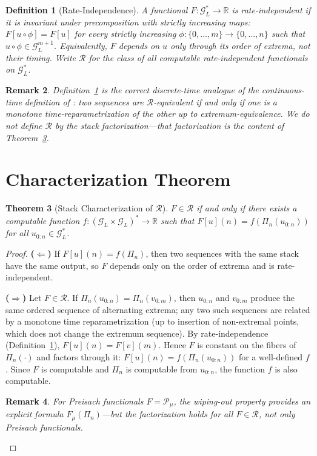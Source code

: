 \documentclass[lettersize,journal]{IEEEtran}
\newtheorem{theorem}{Theorem}
\newtheorem{definition}[theorem]{Definition}
\newtheorem{remark}[theorem]{Remark}
\newcommand{\cR}{\mathcal{R}}
\newcommand{\stack}{\Pi}
\newcommand{\GL}{\mathcal{G}_L}
\newcommand{\Rr}{\mathbb{R}}
\begin{document}
\begin{definition}[Rate-Independence]
\label{def:ri}
A functional $F:\GL^*\to\Rr$ is \emph{rate-independent} if it is
invariant under precomposition with strictly increasing maps:
$F[u\circ\phi] = F[u]$ for every strictly increasing
$\phi:\{0,\ldots,m\} \to \{0,\ldots,n\}$
such that $u\circ\phi \in \GL^{m+1}$.
Equivalently, $F$ depends on $u$ only through its
\emph{order of extrema}, not their timing.
Write $\cR$ for the class of all computable rate-independent
functionals on $\GL^*$.
\end{definition}

\begin{remark}
Definition~\ref{def:ri} is the correct discrete-time analogue of the
continuous-time definition of \cite{Brokate1996}:
two sequences are $\cR$-equivalent if and only if one is a monotone
time-reparametrization of the other up to extremum-equivalence.
We do \emph{not} define $\cR$ by the stack factorization---that
factorization is the content of Theorem~\ref{thm:charact}.
\end{remark}

\section{Characterization Theorem}
\label{sec:charact}

\begin{theorem}[Stack Characterization of $\cR$]
\label{thm:charact}
$F \in \cR$ if and only if there exists a computable function
$f:(\GL\times\GL)^*\to\Rr$ such that
$F[u](n) = f(\stack_n(u_{0:n}))$ for all $u_{0:n}\in\GL^*$.
\end{theorem}

\begin{proof}
\textbf{($\Leftarrow$)} If $F[u](n) = f(\stack_n)$, then two
sequences with the same stack have the same output, so $F$ depends
only on the order of extrema and is rate-independent.

\textbf{($\Rightarrow$)} Let $F \in \cR$.
If $\stack_n(u_{0:n}) = \stack_n(v_{0:m})$, then $u_{0:n}$ and
$v_{0:m}$ produce the same ordered sequence of alternating extrema;
any two such sequences are related by a monotone time
reparametrization (up to insertion of non-extremal points, which
does not change the extremum sequence).
By rate-independence (Definition~\ref{def:ri}),
$F[u](n) = F[v](m)$.
Hence $F$ is constant on the fibers of $\stack_n(\cdot)$ and factors
through it: $F[u](n) = f(\stack_n(u_{0:n}))$ for a well-defined $f$.
Since $F$ is computable and $\stack_n$ is computable from $u_{0:n}$,
the function $f$ is also computable.

\begin{remark}
For Preisach functionals $F = \mathcal{P}_\mu$, the wiping-out
property \cite{Mayergoyz1991} provides an explicit formula
$F_\mu(\stack_n)$---but the factorization holds for all
$F \in \cR$, not only Preisach functionals.
\end{remark}
\end{proof}
\end{document}
